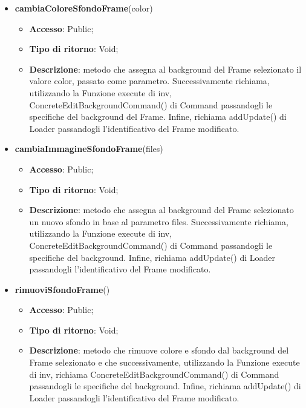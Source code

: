 {{\begin{itemize}
\begin{itemize}
				\item \textbf{Tipo di ritorno}: Void;
				\item \textbf{Descrizione}: metodo che viene richiamato solo in seguito ad una operazione di undo/redo e che per questo, si occupa solamente di aggiornare il background del Frame spec.id nella view.
			\end{itemize}
			\item \textbf{cambiaColoreSfondoFrame}(color)
			\begin{itemize}
				\item \textbf{Accesso}: Public;
				\item \textbf{Tipo di ritorno}: Void;
				\item \textbf{Descrizione}: metodo che assegna al background del Frame selezionato il valore color, passato come parametro. Successivamente richiama, utilizzando la Funzione execute di inv, ConcreteEditBackgroundCommand() di Command passandogli le specifiche del background del Frame. Infine, richiama addUpdate() di Loader passandogli l'identificativo del Frame modificato.
			\end{itemize}
			\item \textbf{cambiaImmagineSfondoFrame}(files)
			\begin{itemize}
				\item \textbf{Accesso}: Public;
				\item \textbf{Tipo di ritorno}: Void;
				\item \textbf{Descrizione}: metodo che assegna al background del Frame selezionato un nuovo sfondo in base al parametro files. Successivamente richiama, utilizzando la Funzione execute di inv, ConcreteEditBackgroundCommand() di Command passandogli le specifiche del background. Infine, richiama addUpdate() di Loader passandogli l'identificativo del Frame modificato.
			\end{itemize}
			\item \textbf{rimuoviSfondoFrame}()
			\begin{itemize}
				\item \textbf{Accesso}: Public;
				\item \textbf{Tipo di ritorno}: Void;
				\item \textbf{Descrizione}: metodo che rimuove colore e sfondo dal background del Frame selezionato e che successivamente, utilizzando la Funzione execute di inv, richiama ConcreteEditBackgroundCommand() di Command passandogli le specifiche del background. Infine, richiama addUpdate() di Loader passandogli l'identificativo del Frame modificato.

\end{itemize}
\end{itemize}}}
